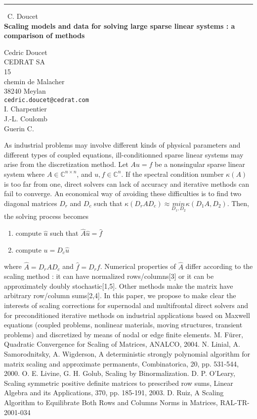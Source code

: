 \documentclass{report}
\begin{document}
\begin{center}
\rule{6in}{1pt} \
{\large C. Doucet \\
{\bf Scaling models and data for solving large sparse linear systems : a comparison of methods}}

Cedric Doucet \\ CEDRAT SA \\ 15 \\ chemin de Malacher \\ 38240 Meylan
\\
{\tt cedric.doucet@cedrat.com}\\
I. Charpentier\\
J.-L. Coulomb\\
	Guerin C.\end{center}

As industrial problems may involve different kinds of physical parameters
and different types of coupled equations, ill-conditionned sparse linear
systems may arise from the discretization method. Let $Au=f$ be a
nonsingular sparse linear system where $A\in \mathbb{C}^{n\times n}$, and
$u,f\in \mathbb{C}^n$. If the spectral condition number $\kappa(A)$ is
too far from one, direct solvers can lack of accuracy and iterative
methods can fail to converge. An economical way of avoiding these
difficulties is to find two diagonal matrices $D_r$ and $D_c$ such that
$\kappa(D_rAD_c) \approx \underset{D_1,D_2}{min}{\kappa(D_1A,D_2)}$.
Then, the solving process becomes
\begin{enumerate}
\item compute $\hat{u}$ such that $\hat{A}\hat{u}=\hat{f}$
\item compute $u = D_c\hat{u}$
\end{enumerate}
where $\hat{A}= D_rAD_c$ and $\hat{f}=D_rf$. Numerical properties of
$\hat{A}$ differ according to the scaling method : it can have normalized
rows/columns[3] or it can be approximately doubly stochastic[1,5]. Other
methods make the matrix have arbitrary row/column sums[2,4]. In this
paper, we propose to make clear the interests of scaling corrections for
supernodal and multifrontal direct solvers and for preconditioned
iterative methods on industrial applications based on Maxwell equations
(coupled problems, nonlinear materials, moving structures, transient
problems) and discretized by means of nodal or edge finite elements.
\newline
\newline
{}
\newline
[1] M. F\"{u}rer, Quadratic Convergence for Scaling of Matrices, ANALCO, 2004.
\newline
[2] N. Linial, A. Samorodnitsky, A. Wigderson, A deterministic strongly
polynomial algorithm for matrix scaling and approximate permanents,
Combinatorica, 20, pp. 531-544, 2000.
\newline
[3] O. E. Livine, G. H. Golub, Scaling by Binormalization.
\newline
[4] D. P. O'Leary, Scaling symmetric positive definite matrices to
prescribed row sums, Linear Algebra and its Applications, 370, pp.
185-191, 2003.
\newline
[5] D. Ruiz, A Scaling Algorithm to Equilibrate Both Rows and Columns
Norms in Matrices, RAL-TR-2001-034
\end{document}
